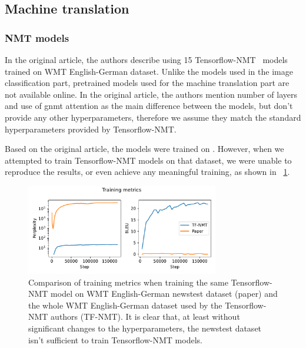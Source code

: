 \begin{figure}
	
\end{figure}

\subsection{Machine translation}

\subsubsection{NMT models} %

In the original article, the authors describe using 15 Tensorflow-NMT~\cite{luong17} models trained on WMT English-German dataset. Unlike the models used in the image classification part, pretrained models used for the machine translation part are not available online. In the original article, the authors mention number of layers and use of gnmt attention as the main difference between the models, but don't provide any other hyperparameters, therefore we assume they match the standard hyperparameters provided by Tensorflow-NMT.

Based on the original article, the models were trained on . However, when we attempted to train Tensorflow-NMT models on that dataset, we were unable to reproduce the results, or even achieve any meaningful training, as shown in \figurename~\ref{fig:tf-nmt_paper_training}.

\begin{figure}[h]
	\centering
	\includegraphics[width=0.75\textwidth]{figures/tf-nmt_paper_training.pdf}
	\caption{Comparison of training metrics when training the same Tensorflow-NMT model on WMT English-German newstest dataset (paper) and the whole WMT English-German dataset used by the Tensorflow-NMT authors (TF-NMT). It is clear that, at least without significant changes to the hyperparameters, the newstest dataset isn't sufficient to train Tensorflow-NMT models.}
	\label{fig:tf-nmt_paper_training}
\end{figure}

